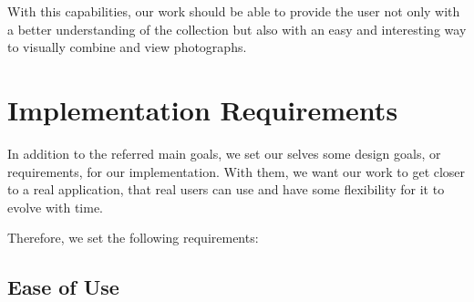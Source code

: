 With this capabilities, our work should be able to provide the user not only with a better understanding of the collection but also with an easy and interesting way to visually combine and view photographs.















\section{Implementation Requirements} %
\label{reqs:Implementation_Requirements}

In addition to the referred main goals, we set our selves some design goals, or requirements, for our implementation. With them, we want our work to get closer to a real application, that real users can use and have some flexibility for it to evolve with time.

Therefore, we set the following requirements:

\subsection{Ease of Use} %
\label{reqs:ease_of_use}

